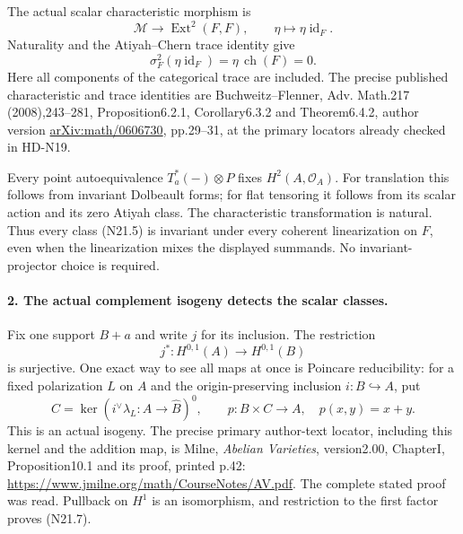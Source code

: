 The actual scalar characteristic morphism is
\[
 \mathcal M\longrightarrow\operatorname{Ext}^2(F,F),\qquad
                       \eta\longmapsto\eta\operatorname{id}_F.
                                                               \tag{N21.5}
\]
Naturality and the Atiyah--Chern trace identity give
\[
 \sigma_F^2(\eta\operatorname{id}_F)
                  =\eta\,\operatorname{ch}(F)=0.              \tag{N21.6}
\]
Here all components of the categorical trace are included.
The precise published characteristic and trace identities are
Buchweitz--Flenner, Adv. Math.217 (2008),243--281,
Proposition6.2.1, Corollary6.3.2 and Theorem6.4.2,
author version \href{https://arxiv.org/pdf/math/0606730}
{arXiv:math/0606730}, pp.29--31, at the primary locators
already checked in HD-N19.

Every point autoequivalence $T_a^*(-)\otimes P$ fixes
$H^2(A,\mathcal O_A)$. For translation this follows from
invariant Dolbeault forms; for flat tensoring it follows
from its scalar action and its zero Atiyah class.
The characteristic transformation is natural. Thus every
class (N21.5) is invariant under every coherent linearization
on $F$, even when the linearization mixes the displayed
summands. No invariant-projector choice is required.

\paragraph{2. The actual complement isogeny detects the scalar classes.}
Fix one support $B+a$ and write $j$ for its inclusion.
The restriction
\[
             j^*:H^{0,1}(A)\longrightarrow H^{0,1}(B)
                                                               \tag{N21.7}
\]
is surjective. One exact way to see all maps at once is
Poincare reducibility: for a fixed polarization $L$ on $A$
and the origin-preserving inclusion $i:B\hookrightarrow A$,
put
\[
 C=\ker(i^\vee\lambda_L:A\to\widehat B)^0,\qquad
 p:B\times C\longrightarrow A,\quad p(x,y)=x+y.
                                                               \tag{N21.8}
\]
This is an actual isogeny. The precise primary author-text
locator, including this kernel and the addition map, is
Milne, \emph{Abelian Varieties}, version2.00, ChapterI,
Proposition10.1 and its proof, printed p.42:
\url{https://www.jmilne.org/math/CourseNotes/AV.pdf}.
The complete stated proof was read. Pullback on $H^1$
is an isomorphism, and restriction to the first factor
proves (N21.7).

